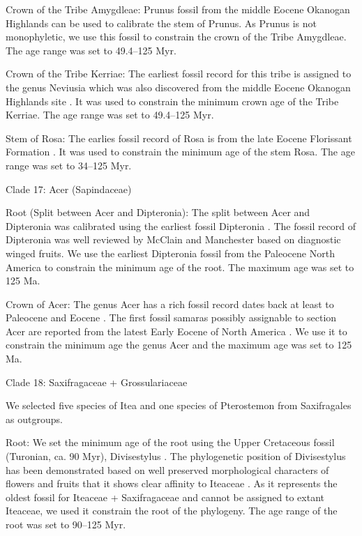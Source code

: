 \documentclass[10pt]{article}
\begin{document}
Crown of the Tribe Amygdleae: Prunus fossil from the middle Eocene
Okanogan Highlands \citep{DeVore2007} can be used to calibrate the
stem of Prunus. As Prunus is not monophyletic, we use this fossil to
constrain the crown of the Tribe Amygdleae. The age range was set to
49.4--125 Myr.

Crown of the Tribe Kerriae: The earliest fossil record for this tribe
is assigned to the genus Neviusia which was also discovered from the
middle Eocene Okanogan Highlands site \citep{DeVore2004}. It was used
to constrain the minimum crown age of the Tribe Kerriae. The age range
was set to 49.4--125 Myr.

Stem of Rosa: The earlies fossil record of Rosa is from the late
Eocene Florissant Formation \citep{Manchester2001}. It was used to
constrain the minimum age of the stem Rosa. The age range was set to
34--125 Myr.

Clade 17: Acer (Sapindaceae)

Root (Split between Acer and Dipteronia): The split between Acer and
Dipteronia was calibrated using the earliest fossil Dipteronia
\citep{McClain2001}. The fossil record of Dipteronia was well reviewed
by McClain and Manchester \citep{McClain2001} based on diagnostic
winged fruits. We use the earliest Dipteronia fossil from the
Paleocene North America to constrain the minimum age of the root. The
maximum age was set to 125 Ma.

Crown of Acer: The genus Acer has a rich fossil record dates back at
least to Paleocene and Eocene \citep{Wolfe1987,Mai1995}. The first
fossil samaras possibly assignable to section Acer are reported from
the latest Early Eocene of North America \citep{Wolfe1987}. We use it
to constrain the minimum age the genus Acer and the maximum age was
set to 125 Ma.

Clade 18: Saxifragaceae + Grossulariaceae

We selected five species of Itea and one species of Pterostemon from
Saxifragales as outgroups. 

Root: We set the minimum age of the root using the Upper Cretaceous
fossil (Turonian, ca. 90 Myr), Divisestylus \citep{Hermsen2003}. The
phylogenetic position of Divisestylus has been demonstrated based on
well preserved morphological characters of flowers and fruits that it
shows clear affinity to Iteaceae \citep{Hermsen2003}. As it represents
the oldest fossil for Iteaceae + Saxifragaceae and cannot be assigned
to extant Iteaceae, we used it constrain the root of the
phylogeny. The age range of the root was set to 90--125 Myr.
\end{document}
